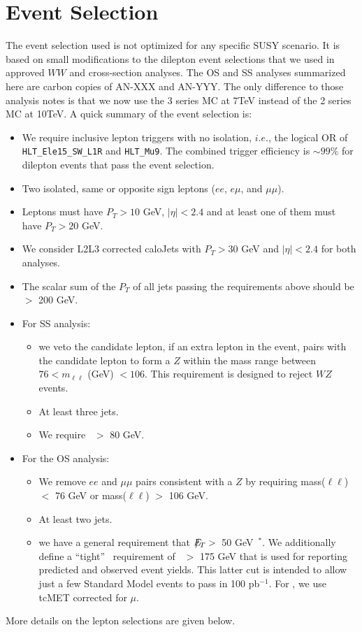 \section{Event Selection}
\label{sec:eventselection}

The event selection used is not optimized for any specific SUSY scenario.
It is based on small modifications to the dilepton event selections 
that we used in approved 
$WW$\cite{ww} and \ttbar\cite{ttbar} cross-section
analyses.  The OS and SS analyses summarized here are carbon copies of AN-XXX and AN-YYY.
The only difference to those analysis notes is that we now use the 3 series MC at 7TeV instead of the 2 series MC at 10TeV.
%
A quick summary of the event selection is:

\begin{itemize}
\item We require inclusive lepton triggers with no isolation, $i.e.$, the
  logical OR of {\tt HLT\_Ele15\_SW\_L1R} and {\tt HLT\_Mu9}. 
  The combined trigger efficiency is $\sim 99$\% for dilepton events that pass the event selection.
\item Two isolated, same or opposite sign leptons ($ee$, $e\mu$, and $\mu\mu$). 
\item Leptons must have $P_T > 10$ GeV, $|\eta|< 2.4$ and at least one of them must have $P_T > 20$ GeV.
\item We consider L2L3 corrected caloJets with $P_T > 30$ GeV and
	$|\eta|< 2.4$ for both analyses. 
\item The scalar sum of the $P_T$ of all jets passing the requirements above should be $>$ 200 GeV.
\item For SS analysis:
\begin{itemize}
      \item  we veto the candidate lepton, if an extra lepton in the event, pairs with the candidate lepton
             to form a $Z$ within the mass range between $76 < m_{\ell\ell} $ (GeV) $< 106$. This requirement is 
             designed to reject $WZ$ events.
      \item At least three jets.
      \item We require \met~$>$ 80 GeV.
\end{itemize}
\item For the OS analysis: 
\begin{itemize}
      \item We remove $ee$ and $\mu\mu$ pairs consistent with a $Z$ by requiring mass($\ell\ell$) $<$ 76 GeV or mass($\ell\ell$) $>$ 106 GeV.
      \item At least two jets.
      \item we have a general requirement that $E\!\!\!\!/_T>$~50 GeV~$^*$. We additionally define a ``tight'' \met~requirement of \met~$>$ 175 GeV
	that is used for reporting predicted and observed event yields.
	This latter cut is intended to allow just a few Standard Model events to
	pass in 100 pb$^{-1}$.  For \met, we use tcMET \cite{tcmet}
	corrected for $\mu$.
\end{itemize}
\end{itemize}
\noindent More details on the lepton %
selections are given below.

